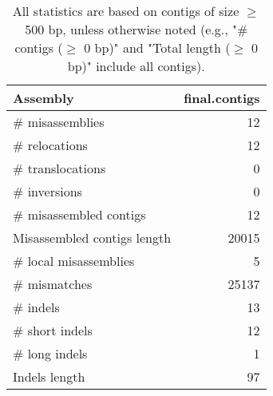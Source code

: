 \documentclass[12pt,a4paper]{article}
\begin{document}
\begin{table}[ht]
\begin{center}
\caption{All statistics are based on contigs of size $\geq$ 500 bp, unless otherwise noted (e.g., "\# contigs ($\geq$ 0 bp)" and "Total length ($\geq$ 0 bp)" include all contigs).}
\begin{tabular}{|l*{1}{|r}|}
\hline
Assembly & final.contigs \\ \hline
\# misassemblies & 12 \\ \hline
\hspace{5mm}\# relocations & 12 \\ \hline
\hspace{5mm}\# translocations & 0 \\ \hline
\hspace{5mm}\# inversions & 0 \\ \hline
\# misassembled contigs & 12 \\ \hline
Misassembled contigs length & 20015 \\ \hline
\# local misassemblies & 5 \\ \hline
\# mismatches & 25137 \\ \hline
\# indels & 13 \\ \hline
\hspace{5mm}\# short indels & 12 \\ \hline
\hspace{5mm}\# long indels & 1 \\ \hline
Indels length & 97 \\ \hline
\end{tabular}
\end{center}
\end{table}
\end{document}
